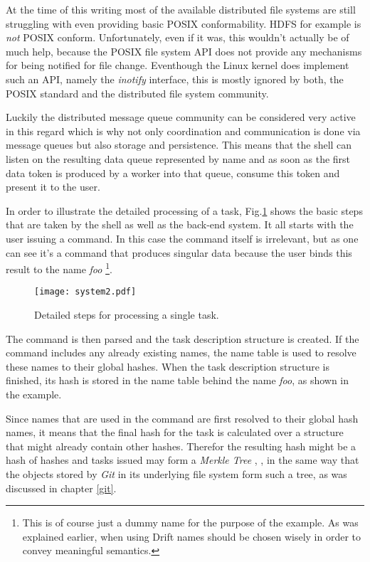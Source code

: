 At the time of this writing most of the available distributed
file systems are still struggling with even providing basic
POSIX conformability. HDFS for example is \textit{not} POSIX
conform. Unfortunately, even if it was, this wouldn't actually be of
much help, because the POSIX file system API does not provide
any mechanisms for being notified for file change. Eventhough
the Linux kernel does implement such an API, namely the
\textit{inotify} interface, this is mostly ignored by both,
the POSIX standard and the distributed file system community.

Luckily the distributed message queue community can be considered
very active in this regard which is why not only coordination
and communication is done via message queues but also storage
and persistence. This means that the shell can listen on the
resulting data queue represented by name and as soon as the first
data token is produced by a worker into that queue, consume this
token and present it to the user.
\newline

In order to illustrate the detailed processing of a task,
Fig.\ref{system2} shows the basic steps that are taken by the
shell as well as the back-end system.
It all starts with the user issuing a command. In this case
the command itself is irrelevant, but as one can see it's a
command that produces singular data because the user binds
this result to the name \textit{foo} \footnote{This is of
course just a dummy name for the purpose of the example. As was
explained earlier, when using Drift names should be chosen wisely
in order to convey meaningful semantics.}.

\begin{figure}[h]
  \texttt{[image: system2.pdf]}
  \caption{Detailed steps for processing a single task.}
  \label{system2}
\end{figure}

The command is then parsed and the task description structure
is created. If the command includes any already existing names,
the name table is used to resolve these names to their global
hashes. When the task description structure is finished, its
hash is stored in the name table behind the name \textit{foo},
as shown in the example.

Since names that are used in the command are first resolved to
their global hash names, it means that the final hash for the
task is calculated over a structure that might already contain
other hashes. Therefor the resulting hash might be a hash of hashes
and tasks issued may form a \textit{Merkle Tree} \cite{merkletree},
\cite{merkletreewiki}, in the same way that the objects stored
by \textit{Git} in its underlying file system form such a tree,
as was discussed in chapter \ref{git}.
\newline

